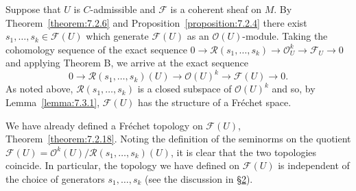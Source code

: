 Suppose that $U$ is $C$-admissible and $\mathcal F$ is a coherent sheaf on $M$. By Theorem~\ref{theorem:7.2.6} and Proposition~\ref{proposition:7.2.4} there exist $s_1,\ldots,s_k\in\mathcal F(U)$ which generate $\mathcal F(U)$ as an $\mathcal O(U)$-module. Taking the cohomology sequence
of the exact sequence $0\to\mathcal R(s_1,\ldots,s_k)\to\mathcal O_U^k\to\mathcal F_U\to0$ and applying Theorem B, we arrive at the exact sequence
\[
0\to\mathcal R(s_1,\ldots,s_k)(U)\to\mathcal O(U)^k\to\mathcal F(U)\to0.
\]
As noted above, $\mathcal R(s_1,\ldots,s_k)$ is a closed subspace of $\mathcal O(U)^k$ and so, by Lemma~\ref{lemma:7.3.1}, $\mathcal F(U)$ has the structure of a Fr\'echet space.

We have already defined a Fr\'echet topology on $\mathcal F(U)$, Theorem~\ref{theorem:7.2.18}. Noting the definition of the seminorms on the quotient $\mathcal F(U)=\mathcal O^k(U)/\mathcal R(s_1,\ldots,s_k)(U)$, it is clear that the two topologies coincide. In particular, the topology we have defined on $\mathcal F(U)$ is independent of the choice of generators $s_1,\ldots,s_k$ (see the discussion in \hyperref[sec:7:2]{\S2}).

